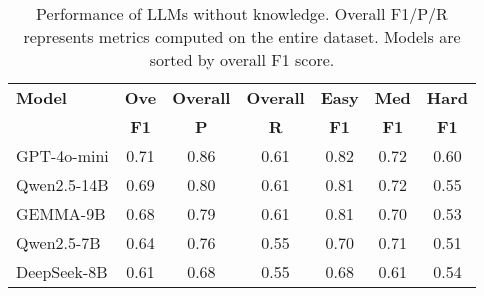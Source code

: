 \begin{table}[h]
\footnotesize  %
\centering
\setlength{\tabcolsep}{4pt}  %
\begin{tabular}{l|ccc|ccc}
\hline
\textbf{Model} & \textbf{Ove} & \textbf{Overall} & \textbf{Overall} & \textbf{Easy} & \textbf{Med} & \textbf{Hard} \\
& \textbf{F1} & \textbf{P} & \textbf{R} & \textbf{F1} & \textbf{F1} & \textbf{F1} \\
\hline
GPT-4o-mini & 0.71 & 0.86 & 0.61 & 0.82 & 0.72 & 0.60 \\
Qwen2.5-14B & 0.69 & 0.80 & 0.61 & 0.81 & 0.72 & 0.55 \\
GEMMA-9B & 0.68 & 0.79 & 0.61 & 0.81 & 0.70 & 0.53 \\
Qwen2.5-7B & 0.64 & 0.76 & 0.55 & 0.70 & 0.71 & 0.51 \\
DeepSeek-8B & 0.61 & 0.68 & 0.55 & 0.68 & 0.61 & 0.54 \\
\hline
\end{tabular}
\caption{Performance of LLMs without knowledge. Overall F1/P/R represents metrics computed on the entire dataset. Models are sorted by overall F1 score.}
\label{tab:llm_performance_without}
\end{table}